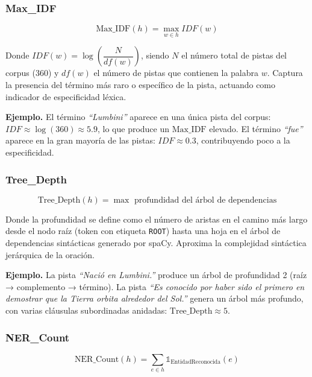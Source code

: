\documentclass[../main.tex]{subfiles}
\begin{document}
\subsubsection{Max\_IDF}

\begin{equation}
\text{Max\_IDF}(h) =
\max_{w \in h} IDF(w)
\end{equation}

Donde $IDF(w) = \log\!\left(\dfrac{N}{df(w)}\right)$, siendo $N$ el número total de pistas del corpus (360) y $df(w)$ el número de pistas que contienen la palabra $w$. Captura la presencia del término más raro o específico de la pista, actuando como indicador de especificidad léxica.

\medskip
\textbf{Ejemplo.} El término \textit{``Lumbini''} aparece en una única pista del corpus: $IDF \approx \log(360) \approx 5.9$, lo que produce un $\text{Max\_IDF}$ elevado. El término \textit{``fue''} aparece en la gran mayoría de las pistas: $IDF \approx 0.3$, contribuyendo poco a la especificidad.

\subsubsection{Tree\_Depth}

\[
\text{Tree\_Depth}(h) =
\max \text{ profundidad del árbol de dependencias}
\]

Donde la profundidad se define como el número de aristas en el camino más largo desde el nodo raíz (token con etiqueta \texttt{ROOT}) hasta una hoja en el árbol de dependencias sintácticas generado por spaCy. Aproxima la complejidad sintáctica jerárquica de la oración.

\medskip
\textbf{Ejemplo.} La pista \textit{``Nació en Lumbini.''} produce un árbol de profundidad 2 (raíz → complemento → término). La pista \textit{``Es conocido por haber sido el primero en demostrar que la Tierra orbita alrededor del Sol.''} genera un árbol más profundo, con varias cláusulas subordinadas anidadas: $\text{Tree\_Depth} \approx 5$.

\subsubsection{NER\_Count}

\begin{equation}
\text{NER\_Count}(h) =
\sum_{e \in h} \mathbb{1}_{\text{EntidadReconocida}}(e)
\end{equation}
\end{document}
